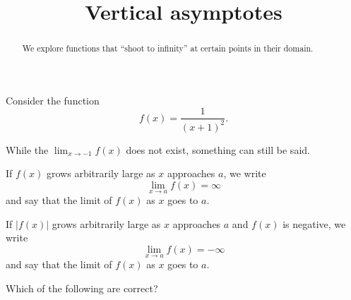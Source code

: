 \documentclass{ximera}
\title[Dig-In:]{Vertical asymptotes}
\begin{document}
\begin{abstract}
We explore functions that ``shoot to infinity'' at certain points in
their domain.
\end{abstract}
\maketitle

Consider the function
\[
f(x) = \frac{1}{(x+1)^2}.
\]
\begin{image}
\end{image}
While the $\lim_{x\to -1} f(x)$ does not exist, something can still be
said.

\begin{definition}\label{def:inflimit}
If $f(x)$ grows arbitrarily large as $x$ approaches $a$, we write
\[
\lim_{x\to a} f(x) = \infty
\]
and say that the limit of $f(x)$  as $x$
goes to $a$.

If $|f(x)|$ grows arbitrarily large as $x$ approaches $a$ and $f(x)$ is
negative, we write
\[
\lim_{x\to a} f(x) = -\infty
\]
and say that the limit of $f(x)$ 
as $x$ goes to $a$.
\end{definition}

\begin{problem}
  Which of the following are correct?
  \begin{selectAll}
  \end{selectAll}
\end{problem}
\end{document}

